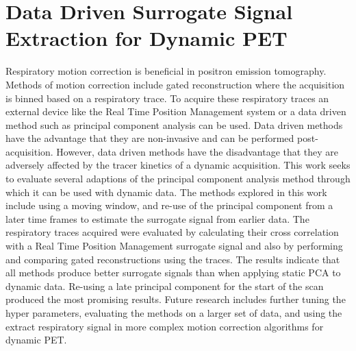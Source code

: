 \chapter{Data Driven Surrogate Signal Extraction for Dynamic PET} \label{sec:data_driven_surrogate_signal_extraction_results}
    \newpage
    
        
    
        Respiratory motion correction is beneficial in positron emission tomography. Methods of motion correction include gated reconstruction where the acquisition is binned based on a respiratory trace. To acquire these respiratory traces an external device like the Real Time Position Management system or a data driven method such as principal component analysis can be used. Data driven methods have the advantage that they are non-invasive and can be performed post-acquisition. However, data driven methods have the disadvantage that they are adversely affected by the tracer kinetics of a dynamic acquisition. This work seeks to evaluate several adaptions of the principal component analysis method through which it  can be used with dynamic data. The methods explored in this work include using a moving window, and re-use of the principal component from a later time frames to estimate the surrogate signal from earlier data. The respiratory traces acquired were evaluated by calculating their cross correlation with a Real Time Position Management surrogate signal and also by performing and comparing gated reconstructions using the traces. The results indicate that all methods produce better surrogate signals than when applying static PCA to dynamic data. Re-using a late principal component for the start of the scan produced the most promising results. Future research includes further tuning the hyper parameters, evaluating the methods on a larger set of data, and using the extract respiratory signal in more complex motion correction algorithms for dynamic PET.
        
